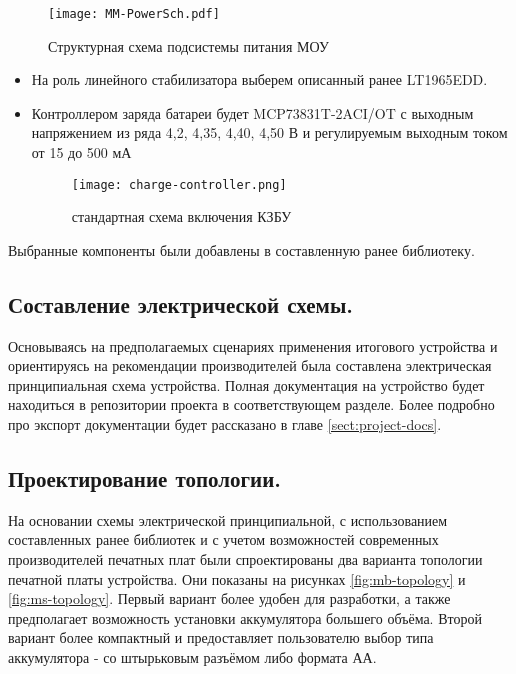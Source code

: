 \begin{figure}[H]
	\centering
	\texttt{[image: MM-PowerSch.pdf]}
	\caption{Структурная схема подсистемы питания МОУ}
	\label{fig:MM-PowerSch}
\end{figure}

\begin{itemize}
	\item На роль линейного стабилизатора выберем описанный ранее LT1965EDD.
	\item Контроллером заряда батареи будет MCP73831T-2ACI/OT с выходным напряжением из ряда 4,2, 4,35, 4,40, 4,50 В и регулируемым выходным током от 15 до 500 мА
	\begin{figure}[H]
		\centering
		\texttt{[image: charge-controller.png]}
		\caption{стандартная схема включения КЗБУ}
		\label{fig:charge-controller}
	\end{figure}
\end{itemize}

Выбранные компоненты были добавлены в составленную ранее библиотеку.

\subsection{Составление электрической схемы.}

Основываясь на предполагаемых сценариях применения итогового устройства и ориентируясь на рекомендации производителей была составлена электрическая принципиальная схема устройства. Полная документация на устройство будет находиться в репозитории проекта в соответствующем разделе. Более подробно про экспорт документации будет рассказано в главе \ref{sect:project-docs}.

\subsection{Проектирование топологии.}

На основании схемы электрической принципиальной, с использованием составленных ранее библиотек и с учетом возможностей современных производителей печатных плат были спроектированы два варианта топологии печатной платы устройства. Они показаны на рисунках \ref{fig:mb-topology} и \ref{fig:ms-topology}. Первый вариант более удобен для разработки, а также предполагает возможность установки аккумулятора большего объёма. Второй вариант более компактный и предоставляет пользователю выбор типа аккумулятора - со штырьковым разъёмом либо формата АА.

